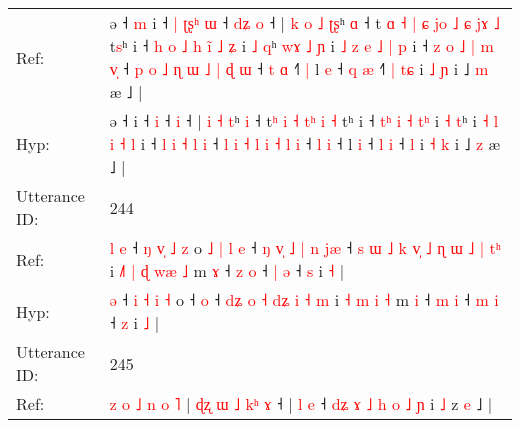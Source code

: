 \documentclass[10pt]{article}
\DeclareRobustCommand{\hl}[1]{{\textcolor{red}{#1}}}
\begin{document}
\begin{longtable}{ll}
Ref: & ə ˧\hl{ }\hl{m} i ˧\hl{ }\hl{|}\hl{ }\hl{ʈ}\hl{ʂ}\hl{ʰ} \hl{ɯ} ˧\hl{ }\hl{d}\hl{ʑ} \hl{o} ˧ |\hl{ }\hl{k} \hl{o} \hl{˩} \hl{ʈ}\hl{ʂ}ʰ \hl{ɑ} ˧ t\hl{ }\hl{ɑ}\hl{ }\hl{˧}\hl{ }\hl{|} \hl{ɕ} \hl{j}\hl{o} \hl{˩}\hl{ }\hl{ɕ} \hl{j}\hl{ɤ} \hl{˩} t\hl{s}ʰ i ˧\hl{ }\hl{h} \hl{o}\hl{ }\hl{˩} \hl{h} \hl{i}\hl{̃} \hl{˩}\hl{ }\hl{ʑ} i \hl{˩} \hl{q}ʰ\hl{ }\hl{w}\hl{ɤ}\hl{ }\hl{˩}\hl{ }\hl{ɲ} i\hl{ }\hl{˩} \hl{z} \hl{e} \hl{˩} \hl{|} \hl{p} i ˧\hl{ }\hl{z} \hl{o} \hl{˩} \hl{|} \hl{m} \hl{v}\hl{̩} ˧\hl{ }\hl{p} \hl{o} \hl{˩} \hl{ɳ} \hl{ɯ} \hl{˩} \hl{|} \hl{ɖ} \hl{ɯ} ˧ \hl{t} \hl{ɑ} ˧\hl{˥}\hl{ }\hl{|} l \hl{e} ˧ \hl{q} \hl{æ} ˧\hl{˥}\hl{ }\hl{|} \hl{t}\hl{ɕ} i \hl{˩} \hl{ɲ} i ˩ \hl{m} æ ˩ |
 \\
Hyp: & ə ˧\hl{}\hl{} i ˧\hl{}\hl{}\hl{}\hl{}\hl{}\hl{} \hl{i} ˧\hl{}\hl{}\hl{} \hl{i} ˧ |\hl{}\hl{} \hl{i} \hl{˧} \hl{}\hl{t}ʰ \hl{i} ˧ t\hl{}\hl{}\hl{}\hl{}\hl{}\hl{ʰ} \hl{i} \hl{}\hl{˧} \hl{}\hl{t}\hl{ʰ} \hl{}\hl{i} \hl{˧} t\hl{}ʰ i ˧\hl{}\hl{} \hl{}\hl{t}\hl{ʰ} \hl{i} \hl{}\hl{˧} \hl{}\hl{t}\hl{ʰ} i \hl{˧} \hl{t}ʰ\hl{}\hl{}\hl{}\hl{}\hl{}\hl{}\hl{} i\hl{}\hl{} \hl{˧} \hl{l} \hl{i} \hl{˧} \hl{l} i ˧\hl{}\hl{} \hl{l} \hl{i} \hl{˧} \hl{l} \hl{}\hl{i} ˧\hl{}\hl{} \hl{l} \hl{i} \hl{˧} \hl{l} \hl{i} \hl{˧} \hl{l} \hl{i} ˧ \hl{l} \hl{i} ˧\hl{}\hl{}\hl{} l \hl{i} ˧ \hl{l} \hl{i} ˧\hl{}\hl{}\hl{} \hl{}\hl{l} i \hl{˧} \hl{k} i ˩ \hl{z} æ ˩ |
 \\
\midrule
Utterance ID: & 244 \\
Ref: & \hl{l}\hl{ }\hl{e} ˧ \hl{ŋ} \hl{v}\hl{̩} \hl{˩} \hl{z} o\hl{ }\hl{˩}\hl{ }\hl{|}\hl{ }\hl{l}\hl{ }\hl{e} ˧\hl{ }\hl{ŋ}\hl{ }\hl{v}\hl{̩}\hl{ }\hl{˩}\hl{ }\hl{|}\hl{ }\hl{n} \hl{j}\hl{æ} ˧\hl{ }\hl{s}\hl{ }\hl{ɯ} \hl{˩}\hl{ }\hl{k} \hl{v}\hl{̩} \hl{˩} \hl{ɳ}\hl{ }\hl{ɯ} \hl{˩} \hl{|} \hl{t}\hl{ʰ} i\hl{ }\hl{˩}\hl{˥} \hl{|} \hl{ɖ} \hl{w}\hl{æ} \hl{˩} m \hl{ɤ} ˧ \hl{z} \hl{o} ˧ \hl{|} \hl{ə} ˧ \hl{s} i \hl{˧} |
 \\
Hyp: & \hl{}\hl{}\hl{ə} ˧ \hl{i} \hl{}\hl{˧} \hl{i} \hl{˧} o\hl{}\hl{}\hl{}\hl{}\hl{}\hl{}\hl{}\hl{} ˧\hl{}\hl{}\hl{}\hl{}\hl{}\hl{}\hl{}\hl{}\hl{}\hl{}\hl{} \hl{}\hl{o} ˧\hl{}\hl{}\hl{}\hl{} \hl{}\hl{d}\hl{ʑ} \hl{}\hl{o} \hl{˧} \hl{}\hl{d}\hl{ʑ} \hl{i} \hl{˧} \hl{}\hl{m} i\hl{}\hl{}\hl{} \hl{˧} \hl{m} \hl{}\hl{i} \hl{˧} m \hl{i} ˧ \hl{m} \hl{i} ˧ \hl{m} \hl{i} ˧ \hl{z} i \hl{˩} |
 \\
\midrule
Utterance ID: & 245 \\
Ref: & \hl{z}\hl{ }\hl{o}\hl{ }\hl{˩} \hl{n} \hl{o} \hl{˥} |\hl{ }\hl{ɖ}\hl{ʐ}\hl{ }\hl{ɯ}\hl{ }\hl{˩}\hl{ }\hl{k}\hl{ʰ} \hl{ɤ} ˧ |\hl{ }\hl{l} \hl{e} ˧\hl{ }\hl{d}\hl{ʑ}\hl{ }\hl{ɤ} \hl{˩} \hl{h} \hl{o} \hl{˩}\hl{ }\hl{ɲ} i \hl{˩} z \hl{e} ˩ |

\end{longtable}
\end{document}
